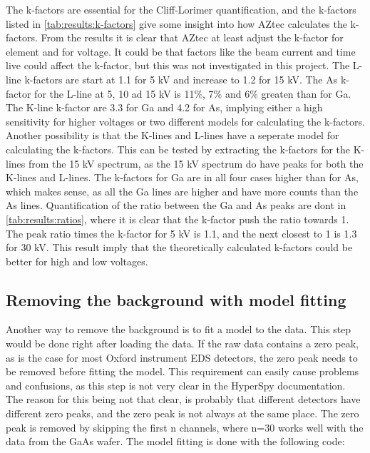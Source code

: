 The k-factors are essential for the Cliff-Lorimer quantification, and the k-factors listed in \cref{tab:results:k-factors} give some insight into how AZtec calculates the k-factors.
From the results it is clear that AZtec at least adjust the k-factor for element and for voltage.
It could be that factors like the beam current and time live could affect the k-factor, but this was not investigated in this project.
The L-line k-factors are start at 1.1 for 5 kV and increase to 1.2 for 15 kV.
The As k-factor for the L-line at 5, 10 ad 15 kV is 11\%, 7\% and 6\% greaten than for Ga.
The K-line k-factor are 3.3 for Ga and 4.2 for As, implying either a high sensitivity for higher voltages or two different models for calculating the k-factors.
Another possibility is that the K-lines and L-lines have a seperate model for calculating the k-factors.
This can be tested by extracting the k-factors for the K-lines from the 15 kV spectrum, as the 15 kV spectrum do have peaks for both the K-lines and L-lines.
The k-factors for Ga are in all four cases higher than for As, which makes sense, as all the Ga lines are higher and have more counts than the As lines.
Quantification of the ratio between the Ga and As peaks are dont in \cref{tab:results:ratios}, where it is clear that the k-factor push the ratio towards 1.
The peak ratio times the k-factor for 5 kV is 1.1, and the next closest to 1 is 1.3 for 30 kV.
This result imply that the theoretically calculated k-factors could be better for high and low voltages.






\subsection{Removing the background with model fitting}
\label{sec:discussion:steps:model_fitting}
Another way to remove the background is to fit a model to the data.
This step would be done right after loading the data.
If the raw data contains a zero peak, as is the case for most Oxford instrument EDS detectors, the zero peak needs to be removed before fitting the model.
This requirement can easily cause problems and confusions, as this step is not very clear in the HyperSpy documentation.
The reason for this being not that clear, is probably that different detectors have different zero peaks, and the zero peak is not always at the same place.
The zero peak is removed by skipping the first n channels, where n=30 works well with the data from the GaAs wafer.
The model fitting is done with the following code:

